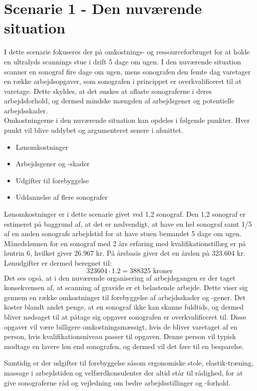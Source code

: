 \section{Scenarie 1 - Den nuværende situation}
I dette scenarie fokuseres der på omkostnings- og ressourceforbruget for at holde en ultralyds scannings stue i drift 5 dage om ugen. I den nuværende situation scanner en sonograf fire dage om ugen, mens sonografen den femte dag varetager en række arbejdsopgaver, som sonografen i princippet er overkvalificeret til at varetage. Dette skyldes, at det ønskes at aflaste sonograferne i deres arbejdsforhold, og dermed mindske mængden af arbejdsgener og potentielle arbejdsskader. \\
Omkostningerne i den nuværende situation kan opdeles i følgende punkter. Hver punkt vil blive uddybet og argumenteret senere i afsnittet. 
\begin{itemize}
\item Lønomkostninger
\item Arbejdsgener og -skader
\item Udgifter til forebyggelse
\item Uddannelse af flere sonografer
\end{itemize}
Lønomkostninger er i dette scenarie givet ved 1,2 sonograf. Den 1,2 sonograf er estimeret på baggrund af, at det er nødvendigt, at have en hel sonograf samt 1/5 af en anden sonografs arbejdstid for at have stuen bemandet 5 dage om ugen. Månedslønnen for en sonograf med 2 års erfaring med kvalifikationstillæg er på løntrin 6, hvilket giver 26.967 kr. På årsbasis giver det en årsløn på 323.604 kr. Lønudgifter er dermed beregnet til:
\begin{equation}
323604\cdot1.2 = 388325 \text{ kroner}
\end{equation}
Det ses også, at i den nuværende organisering af arbejdsgangen er der taget konsekvensen af, at scanning af gravide er et belastende arbejde. Dette viser sig gennem en række omkostninger til forebyggelse af arbejdsskader og -gener. Det koster blandt andet penge, at en sonograf ikke kan skanne fuldtids, og dermed bliver nødsaget til at påtage sig opgaver sonografen er overkvalificeret til. Disse opgaver vil være billigere omkostningsmæssigt, hvis de bliver varetaget af en person, hvis kvalifikationsniveau passer til opgaven. Denne person vil typisk modtage en lavere løn end sonografen, og dermed vil det føre til en besparelse. 

Samtidig er der udgifter til forebyggelse såsom ergonomiske stole, elastik-træning, massage i arbejdstiden og velfærdkonsulenter der altid står til rådighed, for at give sonograferne råd og vejledning om bedre arbejdsstillinger og -forhold. 

